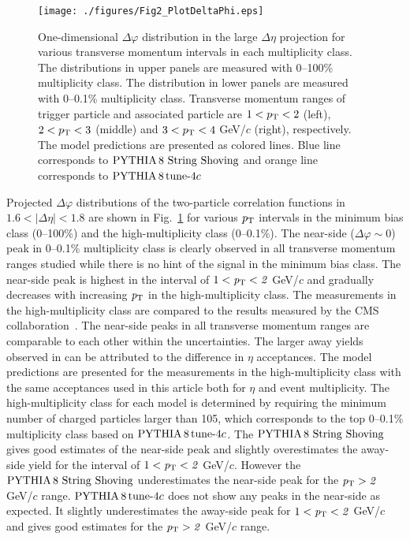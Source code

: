 \begin{figure}[h!]
	\centering
	\texttt{[image: ./figures/Fig2\_PlotDeltaPhi.eps]}
	\caption{One-dimensional $\Delta\varphi$ distribution in the large $\Delta\eta$ projection for various transverse momentum intervals in each multiplicity class. The distributions in upper panels are measured with 0--100\% multiplicity class. The distribution in lower panels are measured with 0--0.1\% multiplicity class. Transverse momentum ranges of trigger particle and associated particle are $1<p_\mathrm{T}<2$ (left), $2<p_\mathrm{T}<3$ (middle) and $3<p_\mathrm{T}<4$ GeV/$c$ (right), respectively. The model predictions are presented as colored lines. Blue line corresponds to ${\mathrm{PYTHIA}\,8~\mathrm{String}~}\mathrm{Shoving}$ and orange line corresponds to $\mathrm{PYTHIA}\,8\,\mathrm{tune}{\text -}4c$}
	\label{fig:PlotDeltaPhi}
\end{figure}
 
Projected $\Delta\varphi$ distributions of the two-particle correlation functions in $1.6<|\Delta\eta|<1.8$ are shown in Fig.~\ref{fig:PlotDeltaPhi} for various $\it{p}_{\rm{T}}$ intervals in the minimum bias class (0--100\%) and the high-multiplicity class (0--0.1\%). The near-side ($\Delta\varphi\sim 0$) peak in 0--0.1\% multiplicity class is clearly observed in all transverse momentum ranges studied while there is no hint of the signal in the minimum bias class. The near-side peak is highest in the interval of $1<\it{p}_{\rm{T}}<2$ GeV/$c$ and gradually decreases with increasing $\it{p}_{\rm{T}}$ in the high-multiplicity class. The measurements in the high-multiplicity class are compared to the results measured by the CMS collaboration~\cite{Khachatryan:2015lva}. The near-side peaks in all transverse momentum ranges are comparable to each other within the uncertainties. The larger away yields observed in \cite{Khachatryan:2015lva} can be attributed to the difference in $\eta$ acceptances. The model predictions are presented for the measurements in the high-multiplicity class with the same acceptances used in this article both for $\eta$ and event multiplicity. The high-multiplicity class for each model is determined by requiring the minimum number of charged particles larger than 105, which corresponds to the top 0--0.1\% multiplicity class based on $\mathrm{PYTHIA}\,8\,\mathrm{tune}{\text -}4c$. The ${\mathrm{PYTHIA}\,8~\mathrm{String}~}\mathrm{Shoving}$ gives good estimates of the near-side peak and slightly overestimates the away-side yield for the interval of $1<\it{p}_{\rm{T}}<2$ GeV/$c$. However the ${\mathrm{PYTHIA}\,8~\mathrm{String}~}\mathrm{Shoving}$ underestimates the near-side peak for the $\it{p}_{\rm{T}}>2$ GeV/$c$ range. $\mathrm{PYTHIA}\,8\,\mathrm{tune}{\text -}4c$ does not show any peaks in the near-side as expected. It slightly underestimates the away-side peak for $1<\it{p}_{\rm{T}}<2$ GeV/$c$ and gives good estimates for the $\it{p}_{\rm{T}}>2$ GeV/$c$ range.



